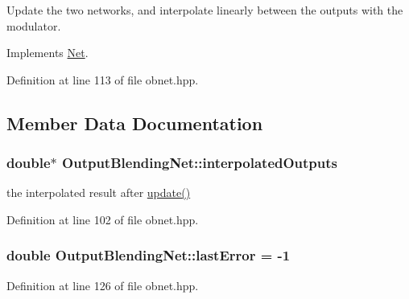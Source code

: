 Update the two networks, and interpolate linearly between the outputs with the modulator. 



Implements \hyperlink{classNet_ad02198e219d3ba060c88d764ce54b905}{Net}.



Definition at line 113 of file obnet.\+hpp.



\subsection{Member Data Documentation}
\subsubsection[{\texorpdfstring{interpolated\+Outputs}{interpolatedOutputs}}]{\setlength{\rightskip}{0pt plus 5cm}double$\ast$ Output\+Blending\+Net\+::interpolated\+Outputs\hspace{0.3cm}{\ttfamily [protected]}}\hypertarget{classOutputBlendingNet_a7630d572e167ebc864377fe9fc9e8b5d}{}\label{classOutputBlendingNet_a7630d572e167ebc864377fe9fc9e8b5d}


the interpolated result after \hyperlink{classOutputBlendingNet_a879f1eedcfad5238d9bdbc78ef5f8250}{update()} 



Definition at line 102 of file obnet.\+hpp.

\subsubsection[{\texorpdfstring{last\+Error}{lastError}}]{\setlength{\rightskip}{0pt plus 5cm}double Output\+Blending\+Net\+::last\+Error = -\/1\hspace{0.3cm}{\ttfamily [protected]}}\hypertarget{classOutputBlendingNet_a8a477ba9ec71fd7780a3efd96539224e}{}\label{classOutputBlendingNet_a8a477ba9ec71fd7780a3efd96539224e}


Definition at line 126 of file obnet.\+hpp.

